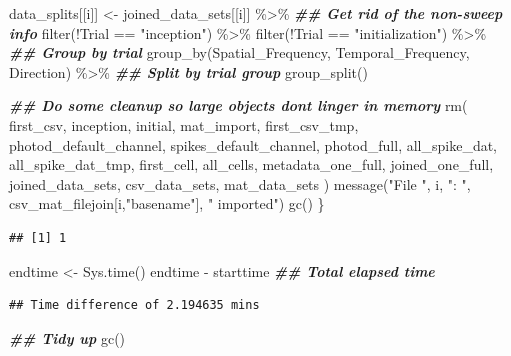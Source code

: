 \documentclass[
]{book}
\newenvironment{Shaded}{\begin{snugshade}}{\end{snugshade}}
\newcommand{\DocumentationTok}[1]{\textcolor[rgb]{0.56,0.35,0.01}{\textbf{\textit{#1}}}}
\newcommand{\FunctionTok}[1]{\textcolor[rgb]{0.00,0.00,0.00}{#1}}
\newcommand{\NormalTok}[1]{#1}
\newcommand{\OtherTok}[1]{\textcolor[rgb]{0.56,0.35,0.01}{#1}}
\newcommand{\SpecialCharTok}[1]{\textcolor[rgb]{0.00,0.00,0.00}{#1}}
\newcommand{\StringTok}[1]{\textcolor[rgb]{0.31,0.60,0.02}{#1}}
\begin{document}
\begin{Shaded}
\begin{Highlighting}[]
\NormalTok{  data\_splits[[i]] }\OtherTok{\textless{}{-}}
\NormalTok{    joined\_data\_sets[[i]] }\SpecialCharTok{\%\textgreater{}\%}
    \DocumentationTok{\#\# Get rid of the non{-}sweep info}
    \FunctionTok{filter}\NormalTok{(}\SpecialCharTok{!}\NormalTok{Trial }\SpecialCharTok{==} \StringTok{"inception"}\NormalTok{) }\SpecialCharTok{\%\textgreater{}\%}
    \FunctionTok{filter}\NormalTok{(}\SpecialCharTok{!}\NormalTok{Trial }\SpecialCharTok{==} \StringTok{"initialization"}\NormalTok{) }\SpecialCharTok{\%\textgreater{}\%}
    \DocumentationTok{\#\# Group by trial}
    \FunctionTok{group\_by}\NormalTok{(Spatial\_Frequency, Temporal\_Frequency, Direction) }\SpecialCharTok{\%\textgreater{}\%}
    \DocumentationTok{\#\# Split by trial group}
    \FunctionTok{group\_split}\NormalTok{()}

  \DocumentationTok{\#\# Do some cleanup so large objects don\textquotesingle{}t linger in memory}
  \FunctionTok{rm}\NormalTok{(}
\NormalTok{    first\_csv, inception, initial, mat\_import, first\_csv\_tmp,}
\NormalTok{    photod\_default\_channel, spikes\_default\_channel, photod\_full,}
\NormalTok{    all\_spike\_dat, all\_spike\_dat\_tmp, first\_cell, all\_cells,}
\NormalTok{    metadata\_one\_full, joined\_one\_full, joined\_data\_sets,}
\NormalTok{    csv\_data\_sets, mat\_data\_sets}
\NormalTok{  )}
  \FunctionTok{message}\NormalTok{(}\StringTok{"File "}\NormalTok{, i, }\StringTok{": "}\NormalTok{, csv\_mat\_filejoin[i,}\StringTok{"basename"}\NormalTok{], }\StringTok{" imported"}\NormalTok{)}
  \FunctionTok{gc}\NormalTok{()}
\NormalTok{\}}
\end{Highlighting}
\end{Shaded}

\begin{verbatim}
## [1] 1
\end{verbatim}

\begin{Shaded}
\begin{Highlighting}[]
\NormalTok{endtime }\OtherTok{\textless{}{-}} \FunctionTok{Sys.time}\NormalTok{()}
\NormalTok{endtime }\SpecialCharTok{{-}}\NormalTok{ starttime }\DocumentationTok{\#\# Total elapsed time}
\end{Highlighting}
\end{Shaded}

\begin{verbatim}
## Time difference of 2.194635 mins
\end{verbatim}

\begin{Shaded}
\begin{Highlighting}[]
\DocumentationTok{\#\# Tidy up}
\FunctionTok{gc}\NormalTok{()}
\end{Highlighting}
\end{Shaded}
\end{document}
